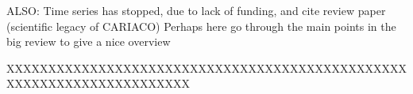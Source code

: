 ALSO: Time series has stopped, due to lack of funding, and cite review paper (scientific legacy of CARIACO) \citep{Muller-Karger2019a}
Perhaps here go through the main points in the big review to give a nice overview



XXXXXXXXXXXXXXXXXXXXXXXXXXXXXXXXXXXXXXXXXXXXXXXXXXXXXXXXXXXXXXXXXXXXXX

